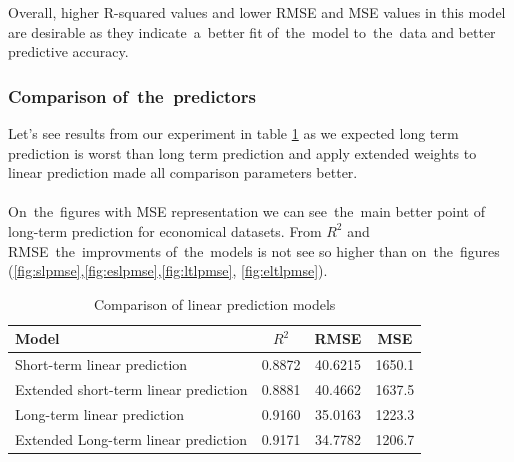     \newpage
    Overall, higher R-squared values and lower RMSE and MSE values in this model are
    desirable as they indicate~a~better fit of~the~model to~the~data and better predictive accuracy.
    \subsubsection{Comparison of~the~predictors} \label{subsec:res_comparison}
    Let's see results from our experiment in table \ref{tab:model_comparison} as we expected
    long term prediction is worst than long term prediction and apply extended weights to
    linear prediction made all comparison parameters better.\\
    \\
    On~the~figures with MSE representation we can see~the~main better point of long-term
    prediction for economical datasets. From $R^2$ and RMSE~the~improvments of~the~models is not
    see so higher than on~the~figures (\ref{fig:slpmse},\ref{fig:eslpmse},\ref{fig:ltlpmse}, \ref{fig:eltlpmse}).
    \begin{table}[!ht]
        \centering
        \begin{tabular}{|l|c|c|c|}
            \hline
            Model & $R^2$ & RMSE & MSE \\
            \hline
            Short-term linear prediction & 0.8872 & 40.6215 & 1650.1 \\
            Extended short-term linear prediction & 0.8881 & 40.4662 & 1637.5 \\
            Long-term linear prediction & 0.9160 & 35.0163 & 1223.3 \\
            Extended Long-term linear prediction & 0.9171 & 34.7782 & 1206.7 \\
            \hline
        \end{tabular}
        \caption{Comparison of linear prediction models}
        \label{tab:model_comparison}
    \end{table}

